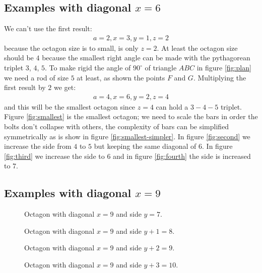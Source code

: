 \documentclass[11pt]{article}
\begin{document}
\subsection{Examples with diagonal $x=6$}

We can't use the first result:
\begin{align*} 
a=2, x=3, y=1, z=2
\end{align*}
because the octagon size is to small, is only $z=2$.
At least the octagon size should be $4$ because the smallest right angle 
can be made with the pythagorean triplet $3$, $4$, $5$. To make rigid the angle of $90^\circ{}$ of triangle $ABC$ in figure \ref{fig:plan} we need a rod of size $5$ at least, as shown the points $F$ and $G$.
Multiplying the first result by $2$ we get:
\begin{align*}
a=4, x=6, y=2, z=4
\end{align*}
and this will be the smallest octagon since $z=4$ can hold a $3-4-5$ triplet.
Figure \ref{fig:smallest} is the smallest octagon; we need to scale the bars in order
the bolts don't collapse with others, the complexity of bars can be simplified 
symmetrically as is show in figure \ref{fig:smallest-simpler}.
In figure \ref{fig:second} we increase the side from $4$ to $5$ but keeping the same diagonal of $6$. In figure \ref{fig:third} we increase the side to $6$ and in figure
\ref{fig:fourth} the side is increased to $7$.


\subsection{Examples with diagonal $x=9$}

\begin{figure}
\centering
{}
\caption{Octagon with diagonal $x=9$ and side $y=7$.}
\label{fig:9-7}
\end{figure}

\begin{figure}
\centering
{}
\caption{Octagon with diagonal $x=9$ and side $y+1=8$.}
\label{fig:9-8}
\end{figure}


\begin{figure}
\centering
{}
\caption{Octagon with diagonal $x=9$ and side $y+2=9$.}
\label{fig:9-9}
\end{figure}

\begin{figure}
\centering
{}
\caption{Octagon with diagonal $x=9$ and side $y+3=10$.}
\label{fig:9-10}
\end{figure}
\end{document}
